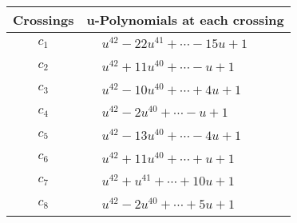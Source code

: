 \documentclass[1p]{elsarticle_modified}
\theoremstyle{definition}
\begin{document}
\begin{tabular}{m{50pt}|m{274pt}}
Crossings & \hspace{64pt}u-Polynomials at each crossing \\
\hline $$\begin{aligned}c_{1}\end{aligned}$$&$\begin{aligned}
&u^{42}-22 u^{41}+\cdots-15 u+1
\end{aligned}$\\
\hline $$\begin{aligned}c_{2}\end{aligned}$$&$\begin{aligned}
&u^{42}+11 u^{40}+\cdots- u+1
\end{aligned}$\\
\hline $$\begin{aligned}c_{3}\end{aligned}$$&$\begin{aligned}
&u^{42}-10 u^{40}+\cdots+4 u+1
\end{aligned}$\\
\hline $$\begin{aligned}c_{4}\end{aligned}$$&$\begin{aligned}
&u^{42}-2 u^{40}+\cdots- u+1
\end{aligned}$\\
\hline $$\begin{aligned}c_{5}\end{aligned}$$&$\begin{aligned}
&u^{42}-13 u^{40}+\cdots-4 u+1
\end{aligned}$\\
\hline $$\begin{aligned}c_{6}\end{aligned}$$&$\begin{aligned}
&u^{42}+11 u^{40}+\cdots+u+1
\end{aligned}$\\
\hline $$\begin{aligned}c_{7}\end{aligned}$$&$\begin{aligned}
&u^{42}+u^{41}+\cdots+10 u+1
\end{aligned}$\\
\hline $$\begin{aligned}c_{8}\end{aligned}$$&$\begin{aligned}
&u^{42}-2 u^{40}+\cdots+5 u+1
\end{aligned}$\\

\end{tabular}
\end{document}
